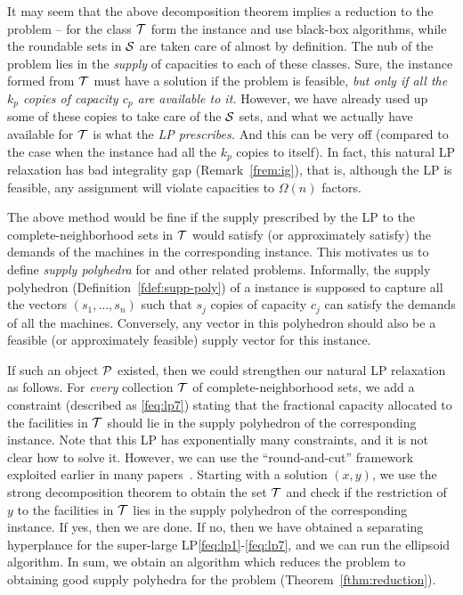 \medskip {}
It may seem that the above decomposition theorem implies a reduction to the \cckp problem -- for the class ${\cal T}$ form the \cckp instance and use black-box algorithms, while the roundable sets in ${\cal S}$ are taken care of almost by definition.
The nub of the problem lies in the {\em supply} of capacities to each of these classes.  Sure, the \cckp instance formed from ${\cal T}$ must have a solution if the \mckc problem is feasible, {\em but only if all the $k_p$ copies of capacity $c_p$ are available to it.} However, we have already used up some of these copies to take care of the ${\cal S}$ sets, and what we actually have available for ${\cal T}$ is what the {\em LP prescribes.} And this can be very off (compared to the case when the \cckp instance had all the $k_p$ copies to itself). In fact, this natural  LP relaxation has bad integrality gap (Remark~\ref{frem:ig}), that is, although the LP is feasible, any assignment will violate capacities to $\Omega(n)$ factors.%

\medskip {}
The above method would be fine if the supply  prescribed by the LP to the complete-neighborhood sets in ${\cal T}$ would satisfy (or approximately satisfy) the demands of the machines in the corresponding \cckp instance. This motivates us  to define {\em supply polyhedra} for \cckp and other related problems. Informally, the supply polyhedron (Definition~\ref{fdef:supp-poly}) of a \cckp instance is supposed to capture all the vectors $(s_1,\ldots,s_n)$ such that $s_j$ copies of capacity $c_j$ can satisfy the demands of all the machines. Conversely, any vector in this polyhedron should also be a feasible (or approximately feasible) supply vector for this instance.

 If such an object ${\cal P}$ existed, then we could strengthen our natural LP relaxation as follows. For {\em every} collection ${\cal T}$ of complete-neighborhood sets, we add a constraint (described as \eqref{feq:lp7}) stating that the fractional capacity allocated to the facilities in ${\cal T}$ should
 lie in the supply polyhedron of the corresponding \cckp instance. Note that this LP has exponentially many constraints, and it is not clear how to solve it. However, we can use the ``round-and-cut'' framework exploited earlier in many papers~\cite{CarrFLP00,ChakrabartyCKK11,AnSS14,DemirciL16,Li15,Li16}. Starting with a solution $(x,y)$, we use the strong decomposition theorem to obtain the set ${\cal T}$ and check if the restriction of $y$ to the facilities in ${\cal T}$ lies in the supply polyhedron of the corresponding \cckp instance. If yes, then we are done.
 If no, then we have obtained a separating hyperplance for the super-large LP\eqref{feq:lp1}-\eqref{feq:lp7}, and we can run the ellipsoid algorithm. In sum, we obtain an algorithm which reduces the \mckc problem to obtaining good supply polyhedra for the \cckp problem (Theorem~\ref{fthm:reduction}).%

